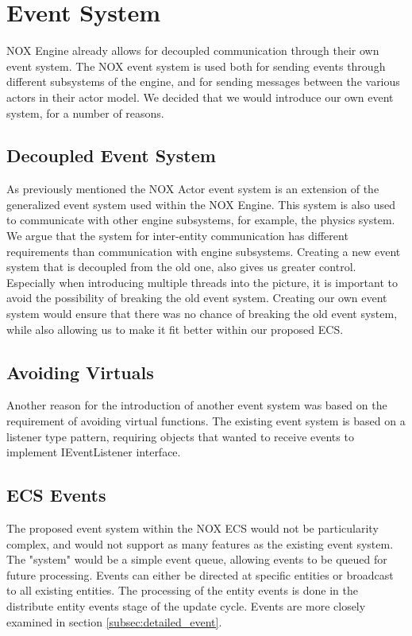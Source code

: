 \section{Event System}
NOX Engine already allows for decoupled communication through their own event system.
The NOX event system is used both for sending events through different subsystems of the engine, and for sending messages between the various actors in their actor model.
We decided that we would introduce our own event system, for a number of reasons.

\subsection{Decoupled Event System}
As previously mentioned the NOX Actor event system is an extension of the generalized event system used within the NOX Engine.
This system is also used to communicate with other engine subsystems, for example, the physics system.
We argue that the system for inter-entity communication has different requirements than communication with engine subsystems.
Creating a new event system that is decoupled from the old one, also gives us greater control.
Especially when introducing multiple threads into the picture, it is important to avoid the possibility of breaking the old event system.
Creating our own event system would ensure that there was no chance of breaking the old event system, while also allowing us to make it fit better within our proposed ECS.

\subsection{Avoiding Virtuals}
Another reason for the introduction of another event system was based on the requirement of avoiding virtual functions.
The existing event system is based on a listener type pattern, requiring objects that wanted to receive events to implement IEventListener interface.

\subsection{ECS Events}
The proposed event system within the NOX ECS would not be particularity complex, and would not support as many features as the existing event system.
The "system" would be a simple event queue, allowing events to be queued for future
processing. Events can either be directed at specific entities or broadcast to all existing entities.
The processing of the entity events is done in the distribute entity events stage of the update cycle.
Events are more closely examined in section \ref{subsec:detailed_event}.
